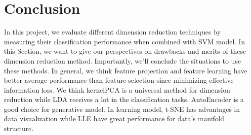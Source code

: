\documentclass{article}
\begin{document}
\section{Conclusion}
In this project, we evaluate different dimension reduction techniques by measuring their classification performance when combined with SVM model. In this Section, we want to give our perspectives on drawbacks and merits of these dimension reduction method. Importantly, we'll conclude the situations to use these methods. In general, we think feature projection and feature learning have better average performance than feature selection since minimizing effective information loss. We think kernelPCA is a universal method for dimension reduction while LDA receives a lot in the classification tasks. AutoEncoder is a good choice for generative model. In learning model, t-SNE has advantages in data visualization while LLE have great performance for data’s manifold structure.


\end{document}
